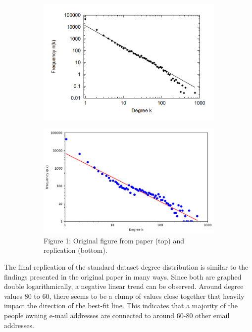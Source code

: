 \documentclass[11pt]{article}
\begin{document}
\begin{multicols}{2}
\begin{figure}[H]
  \centering
  \begin{subfigure}{0.9\linewidth}
    \centering
    \includegraphics[width=\linewidth]{figure1_original.png}
    \label{fig:figure2_original}
  \end{subfigure}
  \begin{subfigure}{0.8\linewidth}
    \centering
    \includegraphics[width=\linewidth]{figure1_replicated.png}
    \label{fig:figure2_replicated}
    \footnotesize{Figure 1: Original figure from paper (top) and replication (bottom).}
  \end{subfigure}
\end{figure}

The final replication of the standard dataset degree distribution is similar to the findings presented in the original paper in many ways. Since both are graphed double logarithmically, a negative linear trend can be observed. Around degree values 80 to 60, there seems to be a clump of values close together that heavily impact the direction of the best-fit line. This indicates that a majority of the people owning e-mail addresses are connected to around 60-80 other email addresses. 


\end{multicols}
\end{document}
